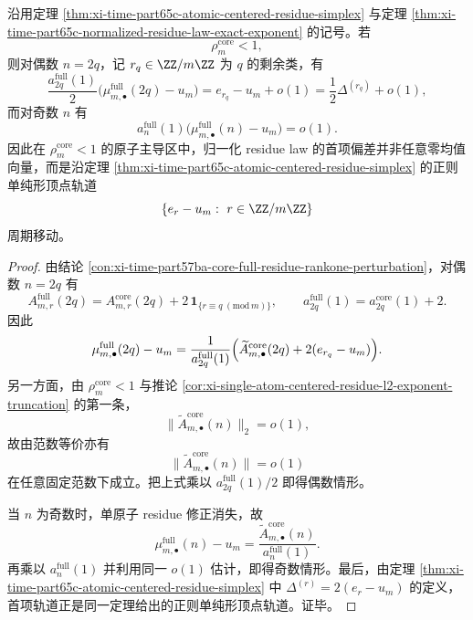 \begin{theorem}\label{thm:xi-time-part65c-atom-dominated-normalized-residue-profile}
沿用定理 \ref{thm:xi-time-part65c-atomic-centered-residue-simplex} 与定理 \ref{thm:xi-time-part65c-normalized-residue-law-exact-exponent} 的记号。若
\[
\rho_m^{\mathrm{core}}<1,
\]
则对偶数 \(n=2q\)，记 \(r_q\in\ZZ/m\ZZ\) 为 \(q\) 的剩余类，有
\[
\boxed{\;
\frac{a_{2q}^{\mathrm{full}}(1)}{2}
\bigl(\mu_{m,\bullet}^{\mathrm{full}}(2q)-u_m\bigr)
=
e_{r_q}-u_m+o(1)
=
\frac12\Delta^{(r_q)}+o(1),\;}
\]
而对奇数 \(n\) 有
\[
\boxed{\;
a_n^{\mathrm{full}}(1)\bigl(\mu_{m,\bullet}^{\mathrm{full}}(n)-u_m\bigr)=o(1).\;}
\]
因此在 \(\rho_m^{\mathrm{core}}<1\) 的原子主导区中，归一化 residue law 的首项偏差并非任意零均值向量，而是沿定理 \ref{thm:xi-time-part65c-atomic-centered-residue-simplex} 的正则单纯形顶点轨道
\[
\{e_r-u_m:\ r\in\ZZ/m\ZZ\}
\]
周期移动。
\end{theorem}
\begin{proof}
由结论 \ref{con:xi-time-part57ba-core-full-residue-rankone-perturbation}，对偶数 \(n=2q\) 有
\[
A_{m,r}^{\mathrm{full}}(2q)
=
A_{m,r}^{\mathrm{core}}(2q)+2\,\mathbf 1_{\{r\equiv q\;(\mathrm{mod}\,m)\}},
\qquad
a_{2q}^{\mathrm{full}}(1)=a_{2q}^{\mathrm{core}}(1)+2.
\]
因此
\[
\mu_{m,\bullet}^{\mathrm{full}}(2q)-u_m
=
\frac{1}{a_{2q}^{\mathrm{full}}(1)}
\Bigl(
\widetilde A_{m,\bullet}^{\mathrm{core}}(2q)+2(e_{r_q}-u_m)
\Bigr).
\]
另一方面，由 \(\rho_m^{\mathrm{core}}<1\) 与推论 \ref{cor:xi-single-atom-centered-residue-l2-exponent-truncation} 的第一条，
\[
\bigl\|\widetilde A_{m,\bullet}^{\mathrm{core}}(n)\bigr\|_2=o(1),
\]
故由范数等价亦有
\[
\bigl\|\widetilde A_{m,\bullet}^{\mathrm{core}}(n)\bigr\|=o(1)
\]
在任意固定范数下成立。把上式乘以 \(a_{2q}^{\mathrm{full}}(1)/2\) 即得偶数情形。

当 \(n\) 为奇数时，单原子 residue 修正消失，故
\[
\mu_{m,\bullet}^{\mathrm{full}}(n)-u_m
=
\frac{\widetilde A_{m,\bullet}^{\mathrm{core}}(n)}{a_n^{\mathrm{full}}(1)}.
\]
再乘以 \(a_n^{\mathrm{full}}(1)\) 并利用同一 \(o(1)\) 估计，即得奇数情形。最后，由定理 \ref{thm:xi-time-part65c-atomic-centered-residue-simplex} 中
\(
\Delta^{(r)}=2(e_r-u_m)
\)
的定义，首项轨道正是同一定理给出的正则单纯形顶点轨道。证毕。
\end{proof}


